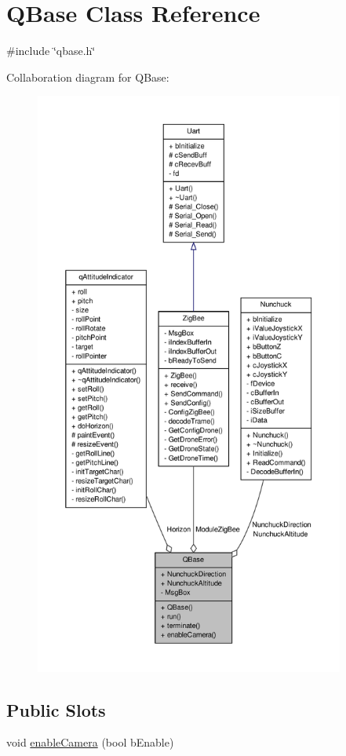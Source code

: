 \hypertarget{classQBase}{\section{Q\-Base Class Reference}
\label{classQBase}
}


{\ttfamily \#include \char`\"{}qbase.\-h\char`\"{}}



Collaboration diagram for Q\-Base\-:\nopagebreak
\begin{figure}[H]
\begin{center}
\leavevmode
\includegraphics[height=550pt]{classQBase__coll__graph}
\end{center}
\end{figure}
\subsection*{Public Slots}
\begin{DoxyCompactItemize}
\item 
void \hyperlink{classQBase_aeee57e313567e3c333d67e827228862a}{enable\-Camera} (bool b\-Enable)
\end{DoxyCompactItemize}
